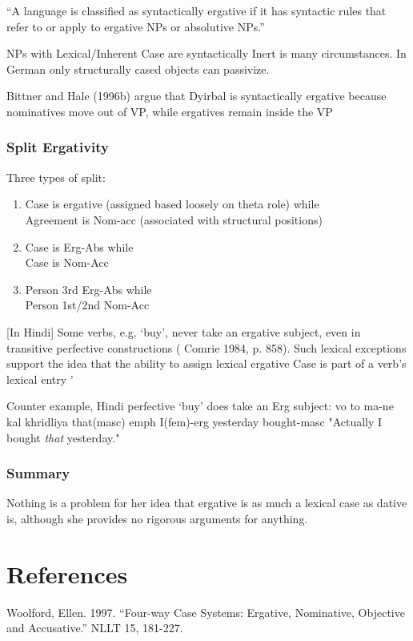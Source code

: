 \documentclass[12pt]{article}
\begin{document}
``A language is
classified as syntactically ergative if it has syntactic rules that refer to or
apply to ergative NPs or absolutive NPs.''


NPs with Lexical/Inherent  Case are syntactically Inert is many circumstances. In German only structurally cased objects can  passivize.

Bittner and Hale (1996b) argue that Dyirbal is syntactically ergative because
nominatives move out of VP, while ergatives remain inside the VP

\subsubsection*{Split Ergativity}
\begin{example}
Three types of split:
\begin{enumerate}
\item Case is ergative (assigned based loosely on theta role) while\\
 Agreement is Nom-acc (associated with structural positions)

\item Case is  Erg-Abs while\\	
Case is Nom-Acc
\item Person 3rd Erg-Abs while \\
Person 1st/2nd Nom-Acc
\end{enumerate}
\end{example}

[In Hindi] Some verbs, e.g. `buy', never take an ergative
subject, even in transitive perfective constructions ( Comrie 1984, p. 858).
Such lexical exceptions support the idea that the ability to assign lexical
ergative Case is part of a verb's lexical entry	'


\begin{example}
Counter example, Hindi perfective `buy' does take an Erg subject:
\gll vo to ma-ne kal khridliya
that(masc) emph I(fem)-erg yesterday bought-masc
\glt "Actually I bought \emph{that} yesterday."
\glend
\end{example}

\subsubsection*{Summary}
Nothing is a problem for her idea that ergative is as much a lexical case as dative is, although she provides no rigorous arguments for anything.
\section*{References}
\begin{reflist}
Woolford, Ellen. 1997. ``Four-way Case Systems: Ergative, Nominative, Objective and Accusative.'' NLLT 15, 181-227.
\end{reflist}
\end{document}
